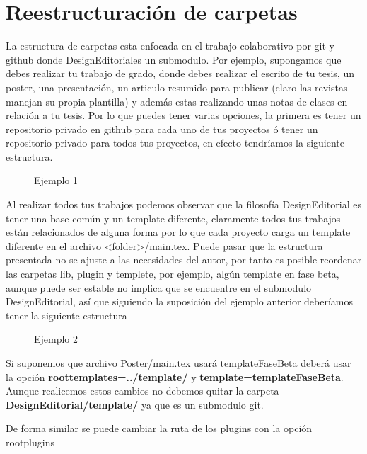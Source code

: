 {	\section{Reestructuración de carpetas}
	La estructura de carpetas esta enfocada en el trabajo colaborativo por git y github donde DesignEditorial\printversion\space es un submodulo. Por ejemplo, supongamos que debes realizar tu trabajo de grado, donde debes realizar el escrito de tu tesis, un poster, una presentación, un articulo resumido para publicar (claro las revistas manejan su propia plantilla) y además estas realizando unas notas de clases en relación a tu tesis.\pap
	Por lo que puedes tener varias opciones, la primera es tener un repositorio privado en github para cada uno de tus proyectos ó tener un repositorio privado para todos tus proyectos, en efecto tendríamos la siguiente estructura.
	\begin{figure}[H]
		\caption{Ejemplo 1}
		\label{fig:EstructuraEjemplo1}
	\end{figure}
	Al realizar todos tus trabajos podemos observar que la filosofía DesignEditorial es tener una base común y un template diferente, claramente todos tus trabajos están relacionados de alguna forma por lo que cada proyecto carga un template diferente en el archivo <folder>/main.tex.\pap
	Puede pasar que la estructura presentada no se ajuste a las necesidades del autor, por tanto es posible reordenar las carpetas lib, plugin y templete, por ejemplo, algún template en fase beta, aunque puede ser estable no implica que se encuentre en el submodulo DesignEditorial\printversion\space, así que siguiendo la suposición del ejemplo anterior deberíamos tener la siguiente estructura
	\begin{figure}[H]
		\caption{Ejemplo 2}
		\label{fig:EstructuraEjemplo2}
	\end{figure}
	Si suponemos que archivo Poster/main.tex usará templateFaseBeta deberá usar la opción \textbf{roottemplates=../template/} y \textbf{template=templateFaseBeta}. Aunque realicemos estos cambios no debemos quitar la carpeta \textbf{DesignEditorial\printversion/template/} ya que es un submodulo git.
	\begin{boxbasic}[Nota]
		De forma similar se puede cambiar la ruta de los plugins con la opción rootplugins
	\end{boxbasic}
}
